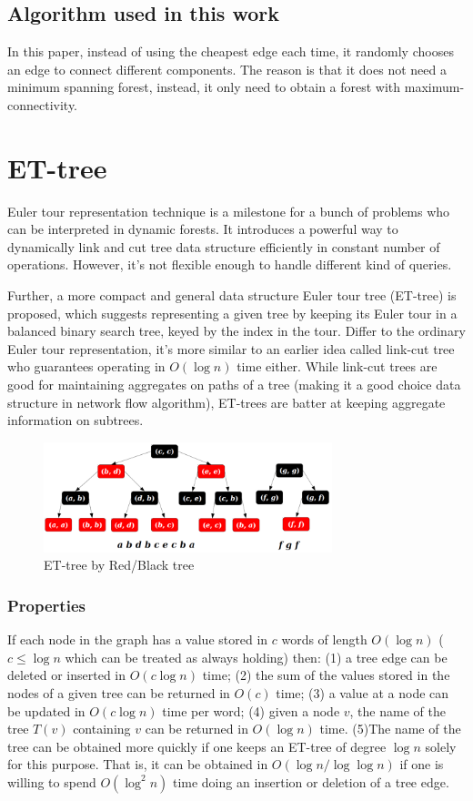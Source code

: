 \documentclass[conference,compsoc]{IEEEtran}
\begin{document}
\subsection{Algorithm used in this work}
	In this paper, instead of using the cheapest edge each time, it randomly chooses an edge to connect different components. The reason is that it does not need a minimum spanning forest, instead, it only need to obtain a forest with maximum-connectivity.

\section{ET-tree}
Euler tour representation technique  \cite{715896} is a milestone for a bunch of problems who can be interpreted in dynamic forests. It introduces a powerful way to dynamically link and cut tree data structure efficiently in constant number of operations. However, it's not flexible enough to handle different kind of queries.

Further, a more compact and general data structure Euler tour tree \cite{Henzinger:1995:RDG:225058.225269} (ET-tree) is proposed, which suggests representing a given tree by keeping its Euler tour in a balanced binary search tree, keyed by the index in the tour. Differ to the ordinary Euler tour representation, it's more similar to an earlier idea called link-cut tree\cite{Sleator:1985:SBS:3828.3835} who guarantees operating in $O(\log n)$ time either. While link-cut trees are good for maintaining aggregates on paths of a tree (making it a good choice data structure in network flow algorithm), ET-trees are batter at keeping aggregate information on subtrees.

\begin{figure}[h]
	\centering
	\includegraphics[height=3.2cm]{Pic/ET-tree.png}
	\caption{ET-tree by Red/Black tree}
	\label{fig:0}
\end{figure}

\subsubsection*{Properties} If each node in the graph has a value stored in $c$ words of length $O(\log n)$ ($c\leq \log n$ which can be treated as always holding) then: 
(1) a tree edge can be deleted or inserted in $O(c \log n)$ time;
(2) the sum of the values stored in the nodes of a given tree can be returned in $O(c)$ time; 
(3) a value at a node can be updated in $O(c \log n)$ time per word; 
(4) given a node $v$, the name of the tree $T(v)$ containing $v$ can be returned in $O(\log n)$ time. 
(5)The name of the tree can be obtained more quickly if one keeps an ET-tree of degree $\log n$ solely for this purpose. That is, it can be obtained in $O(\log n/ \log \log n)$ if one is willing to spend $O(\log^2 n)$ time doing an insertion or deletion of a tree edge.
\end{document}

